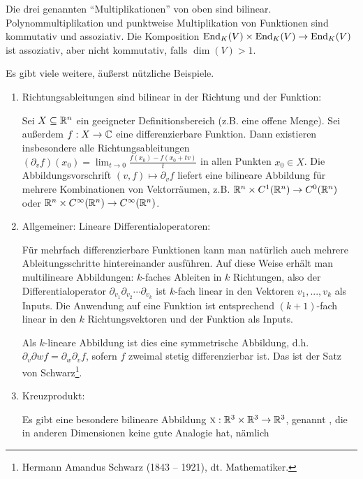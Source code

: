 \begin{example}
	Die drei genannten \enquote{Multiplikationen} von oben sind bilinear. Polynommultiplikation und punktweise Multiplikation von Funktionen sind kommutativ und assoziativ. Die Komposition $\operatorname{End}_K(V)\times\operatorname{End}_K(V)\to\operatorname{End}_K(V)$ ist assoziativ, aber nicht kommutativ, falls $\dim(V) > 1$.
	
	Es gibt viele weitere, äußerst nützliche Beispiele.
	\begin{enumerate}[start=4]
		\item Richtungsableitungen sind bilinear in der Richtung und der Funktion:
		
		Sei $X\subseteq\mathbb{R}^n$ ein geeigneter Definitionsbereich (z.B. eine offene Menge). Sei außerdem $f:X \to\mathbb{C}$ eine differenzierbare Funktion. Dann existieren insbesondere alle Richtungsableitungen $(\partial_vf)(x_0) = \lim_{t\to 0} \frac{f(x_0)-f(x_0+tv)}{t}$ in allen Punkten $x_0\in X$. Die Abbildungsvorschrift $(v,f) \mapsto \partial_v f$ liefert eine bilineare Abbildung für mehrere Kombinationen von Vektorräumen, z.B. $\mathbb{R}^n \times C^1(\mathbb{R}^n) \to C^0(\mathbb{R}^n)$ oder $\mathbb{R}^n \times C^\infty(\mathbb{R}^n) \to C^\infty(\mathbb{R}^n)$.
		
		\item Allgemeiner: Lineare Differentialoperatoren:
		
		Für mehrfach differenzierbare Funktionen kann man natürlich auch mehrere Ableitungsschritte hintereinander ausführen. Auf diese Weise erhält man multilineare Abbildungen: $k$-faches Ableiten in $k$ Richtungen, also der Differentialoperator $\partial_{v_1} \partial_{v_2} \cdots \partial_{v_k}$ ist $k$-fach linear in den Vektoren $v_1, ..., v_k$ als Inputs. Die Anwendung auf eine Funktion ist entsprechend $(k+1)$-fach linear in den $k$ Richtungsvektoren und der Funktion als Inputs.
		
		Als $k$-lineare Abbildung ist dies eine symmetrische Abbildung, d.h. $\partial_v \partial w f = \partial_w\partial_v f$, sofern $f$ zweimal stetig differenzierbar ist. Das ist der Satz von Schwarz\footnote{Hermann Amandus Schwarz (1843 -- 1921), dt. Mathematiker.}.
		
		\item Kreuzprodukt:
		
		Es gibt eine besondere bilineare Abbildung $\textsc{x} : \mathbb{R}^3 \times \mathbb{R}^3 \to \mathbb{R}^3$, genannt , die in anderen Dimensionen keine gute Analogie hat, nämlich
		

\end{enumerate}
\end{example}
